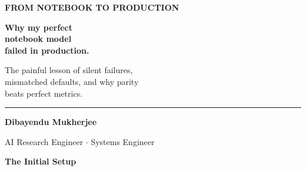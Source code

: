 \documentclass[11pt]{article}
\begin{document}
\thispagestyle{empty}
\vspace*{0.8in}

\begin{center}

    {\fontsize{14}{16}\selectfont\color{brandblue}\textbf{
    FROM NOTEBOOK TO PRODUCTION
    }}

    \vspace{0.8in}

    {\fontsize{40}{48}\selectfont\color{brandnavy}\bfseries
Why my perfect\\[0.15in]
notebook model\\[0.25in]
failed in production.
}

    \vspace{0.6in}

    {\fontsize{18}{24}\selectfont\color{brandgray}
    The painful lesson of silent failures,\\
    mismatched defaults, and why parity\\
    beats perfect metrics.
    }

    \vfill

    \begin{minipage}{0.8\textwidth}
        \centering
        \rule{0.6\linewidth}{0.5pt}

        \vspace{0.2in}

        {\fontsize{12}{14}\selectfont\color{brandnavy}
        \textbf{Dibayendu Mukherjee}
        }

        \vspace{0.05in}

        {\fontsize{10}{12}\selectfont\color{brandgray}
        AI Research Engineer \quad $\cdot$ \quad Systems Engineer
        }

    \end{minipage}

\end{center}

\newpage

\vspace*{0.4in}

\begin{center}
{\fontsize{26}{30}\selectfont\color{brandnavy}\bfseries 
The Initial Setup}
\end{center}
\end{document}
